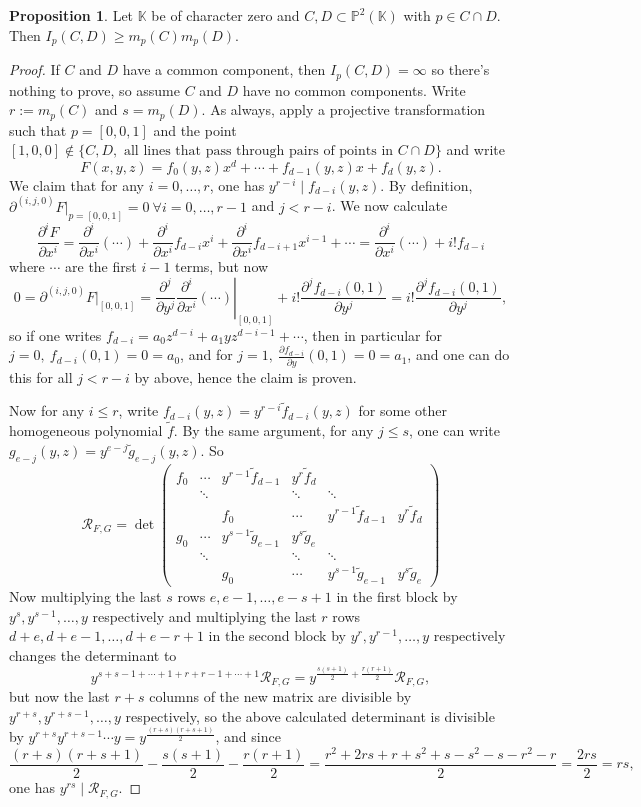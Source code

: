 \documentclass{article}
\newcommand{\K}{\mathbb{K}}
\newcommand{\p}{\mathbb{P}}
\newcommand{\re}{\mathcal{R}}
\theoremstyle{definition}
\newtheorem{prop}[defn]{Proposition}
\begin{document}
\begin{prop}
Let $\K$ be of character zero and $C,D\subset\p^2(\K)$ with $p\in C\cap D$. Then $I_p(C,D)\geq m_p(C)m_p(D)$.
\end{prop}
\begin{proof}
If $C$ and $D$ have a common component, then $I_p(C,D)=\infty$ so there's nothing to prove, so assume $C$ and $D$ have no common components. Write $r:=m_p(C)$ and $s=m_p(D)$. As always, apply a projective transformation such that $p=[0,0,1]$ and the point $[1,0,0]\notin\{C,D,\text{ all lines that pass through pairs of points in }C\cap D\}$ and write
\[
F(x,y,z)=f_0(y,z)x^d+\cdots+f_{d-1}(y,z)x+f_d(y,z).
\]
We claim that for any $i=0,\ldots,r$, one has $y^{r-i}\mid f_{d-i}(y,z)$. By definition, $\partial^{(i,j,0)}F|_{p=[0,0,1]}=0 \ \forall i=0,\ldots,r-1$ and $j<r-i$. We now calculate
\[
\frac{\partial^i F}{\partial x^i}=\frac{\partial^i }{\partial x^i}(\cdots)+\frac{\partial^i}{\partial x^i} f_{d-i}x^i+\frac{\partial^i}{\partial x^i} f_{d-i+1}x^{i-1}+\cdots=\frac{\partial^i }{\partial x^i}(\cdots)+i!f_{d-i}
\]
where $\cdots$ are the first $i-1$ terms, but now
\[
0=\partial^{(i,j,0)}F|_{[0,0,1]}=\left.\frac{\partial^j}{\partial y^j}\frac{\partial^i }{\partial x^i}(\cdots)\right|_{[0,0,1]}+i!\frac{\partial^j f_{d-i}(0,1)}{\partial y^j}=i!\frac{\partial^j f_{d-i}(0,1)}{\partial y^j},
\]
so if one writes $f_{d-i}=a_0z^{d-i}+a_1yz^{d-i-1}+\cdots$, then in particular for $j=0,\ f_{d-i}(0,1)=0=a_0$, and for $j=1,\ \frac{\partial f_{d-i}}{\partial y}(0,1)=0=a_1$, and one can do this for all $j<r-i$ by above, hence the claim is proven.

Now for any $i\leq r$, write $f_{d-i}(y,z)=y^{r-i}\widetilde f_{d-i}(y,z)$ for some other homogeneous polynomial $\widetilde f$. By the same argument, for any $j\leq s$, one can write $g_{e-j}(y,z)=y^{e-j}\widetilde g_{e-j}(y,z)$. So
\[
\re_{F,G}=\det\begin{pmatrix}
f_0 & \cdots & y^{r-1}\widetilde f_{d-1} & y^r\widetilde f_d \\
& \ddots & & \ddots & \ddots \\
& & f_0 & \cdots & y^{r-1}\widetilde f_{d-1} & y^r\widetilde f_d \\
g_0 & \cdots & y^{s-1}\widetilde g_{e-1} & y^s\widetilde g_e \\
& \ddots & & \ddots & \ddots \\
& & g_0 & \cdots & y^{s-1}\widetilde g_{e-1} & y^s\widetilde g_e
\end{pmatrix}
\]
Now multiplying the last $s$ rows $e,e-1,\ldots,e-s+1$ in the first block by $y^s,y^{s-1},\ldots,y$ respectively and multiplying the last $r$ rows $d+e,d+e-1,\ldots,d+e-r+1$ in the second block by $y^r,y^{r-1},\ldots,y$ respectively changes the determinant to
\[
y^{s+s-1+\cdots+1+r+r-1+\cdots+1}\re_{F,G}=y^{\frac{s(s+1)}{2}+\frac{r(r+1)}{2}}\re_{F,G},
\]
but now the last $r+s$ columns of the new matrix are divisible by $y^{r+s},y^{r+s-1},\ldots,y$ respectively, so the above calculated determinant is divisible by $y^{r+s}y^{r+s-1}\cdots y=y^{\frac{(r+s)(r+s+1)}{2}}$, and since
\[
\frac{(r+s)(r+s+1)}{2}-\frac{s(s+1)}{2}-\frac{r(r+1)}{2}=\frac{r^2+2rs+r+s^2+s-s^2-s-r^2-r}{2}=\frac{2rs}{2}=rs,
\]
one has $y^{rs}\mid\re_{F,G}$.
\end{proof}
\end{document}
